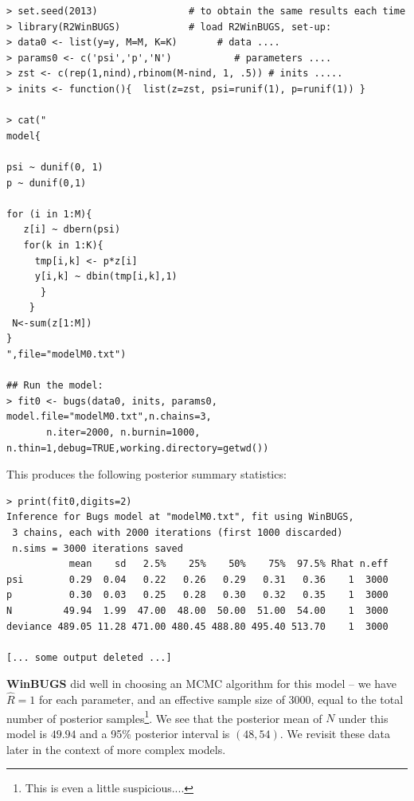 {\small
\begin{verbatim}
> set.seed(2013)                # to obtain the same results each time
> library(R2WinBUGS)            # load R2WinBUGS, set-up:
> data0 <- list(y=y, M=M, K=K)       # data ....
> params0 <- c('psi','p','N')           # parameters .... 
> zst <- c(rep(1,nind),rbinom(M-nind, 1, .5)) # inits .....
> inits <- function(){  list(z=zst, psi=runif(1), p=runif(1)) }

> cat("
model{

psi ~ dunif(0, 1)
p ~ dunif(0,1)

for (i in 1:M){
   z[i] ~ dbern(psi)
   for(k in 1:K){
     tmp[i,k] <- p*z[i]
     y[i,k] ~ dbin(tmp[i,k],1)
      }
    }
 N<-sum(z[1:M])
}
",file="modelM0.txt")

## Run the model:
> fit0 <- bugs(data0, inits, params0, model.file="modelM0.txt",n.chains=3,
       n.iter=2000, n.burnin=1000, n.thin=1,debug=TRUE,working.directory=getwd())
\end{verbatim}
}
This produces the following posterior
 summary statistics:
{\small
\begin{verbatim}
> print(fit0,digits=2)
Inference for Bugs model at "modelM0.txt", fit using WinBUGS,
 3 chains, each with 2000 iterations (first 1000 discarded)
 n.sims = 3000 iterations saved
           mean    sd   2.5%    25%    50%    75%  97.5% Rhat n.eff
psi        0.29  0.04   0.22   0.26   0.29   0.31   0.36    1  3000
p          0.30  0.03   0.25   0.28   0.30   0.32   0.35    1  3000
N         49.94  1.99  47.00  48.00  50.00  51.00  54.00    1  3000
deviance 489.05 11.28 471.00 480.45 488.80 495.40 513.70    1  3000

[... some output deleted ...]
\end{verbatim}
}
{\bf WinBUGS} did well in choosing an MCMC algorithm for this model --
we have $\hat{R} = 1$ for each parameter, and an effective sample size
of 3000, equal to the total number of posterior samples\footnote{This is even a little
suspicious....}.
We see that the posterior mean of $N$ under this
model is $49.94$ and a 95\% posterior interval is $(48,54)$.  We
revisit these data later in the context of more complex models.

